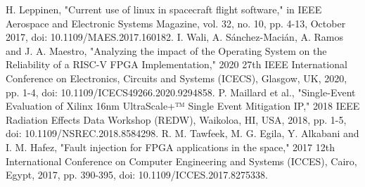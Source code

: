 \documentclass[conference]{IEEEtran}
\begin{document}
\begin{thebibliography}{10}
     H. Leppinen, "Current use of linux in spacecraft flight software," in IEEE Aerospace and Electronic Systems Magazine,
     vol. 32, no. 10, pp. 4-13, October 2017, doi: 10.1109/MAES.2017.160182. 
     I. Wali, A. Sánchez-Macián, A. Ramos and J. A. Maestro, "Analyzing the impact of the Operating System on the Reliability
     of a RISC-V FPGA Implementation," 2020 27th IEEE International Conference on Electronics, Circuits and Systems (ICECS), Glasgow, UK, 2020,
    pp. 1-4, doi: 10.1109/ICECS49266.2020.9294858.
     P. Maillard et al., "Single-Event Evaluation of Xilinx 16nm UltraScale+™ Single Event Mitigation IP," 2018 IEEE Radiation 
     Effects Data Workshop (REDW), Waikoloa, HI, USA, 2018, pp. 1-5, doi: 10.1109/NSREC.2018.8584298.
     R. M. Tawfeek, M. G. Egila, Y. Alkabani and I. M. Hafez, "Fault injection for FPGA applications in the space," 2017 12th
     International Conference on Computer Engineering and Systems (ICCES), Cairo, Egypt, 2017, pp. 390-395, doi: 10.1109/ICCES.2017.8275338.
     
    
\end{thebibliography}
\end{document}
